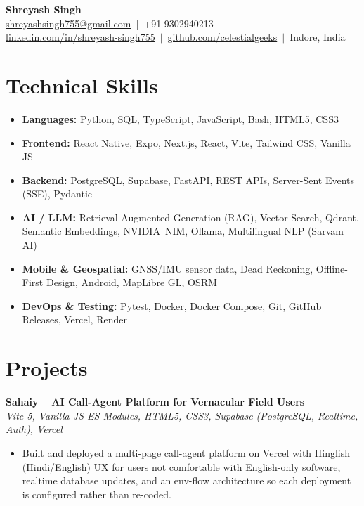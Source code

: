 \documentclass[letterpaper,11pt]{article}
\begin{document}
\begin{center}
  {\LARGE \bfseries Shreyash Singh}\\[3pt]
  \href{mailto:shreyashsingh755@gmail.com}{shreyashsingh755@gmail.com} \,$|$\, +91-9302940213 \\
  \href{https://linkedin.com/in/shreyash-singh755}{linkedin.com/in/shreyash-singh755} \,$|$\,
  \href{https://github.com/celestialgeeks}{github.com/celestialgeeks} \,$|$\, Indore, India
\end{center}

\section{Technical Skills}
\begin{itemize}
  \item \textbf{Languages:} Python, SQL, TypeScript, JavaScript, Bash, HTML5, CSS3
  \item \textbf{Frontend:} React Native, Expo, Next.js, React, Vite, Tailwind CSS, Vanilla JS
  \item \textbf{Backend:} PostgreSQL, Supabase, FastAPI, REST APIs, Server-Sent Events (SSE), Pydantic
  \item \textbf{AI / LLM:} Retrieval-Augmented Generation (RAG), Vector Search, Qdrant, Semantic Embeddings,
        NVIDIA~NIM, Ollama, Multilingual NLP (Sarvam AI)
  \item \textbf{Mobile \& Geospatial:} GNSS/IMU sensor data, Dead Reckoning, Offline-First Design, Android,
        MapLibre GL, OSRM
  \item \textbf{DevOps \& Testing:} Pytest, Docker, Docker Compose, Git, GitHub Releases, Vercel, Render
\end{itemize}

\section{Projects}
\textbf{Sahaiy -- AI Call-Agent Platform for Vernacular Field Users} \\
\hspace*{0.15in}\textit{Vite 5, Vanilla JS ES Modules, HTML5, CSS3, Supabase (PostgreSQL, Realtime, Auth), Vercel}
\begin{itemize}[leftmargin=0.32in,labelsep=0.45em,itemsep=1pt,topsep=2pt,partopsep=0pt,parsep=0pt]
  \item Built and deployed a multi-page call-agent platform on Vercel with Hinglish (Hindi/English) UX for
        users not comfortable with English-only software, realtime database updates, and an env-flow
        architecture so each deployment is configured rather than re-coded.
\end{itemize}
\end{document}
